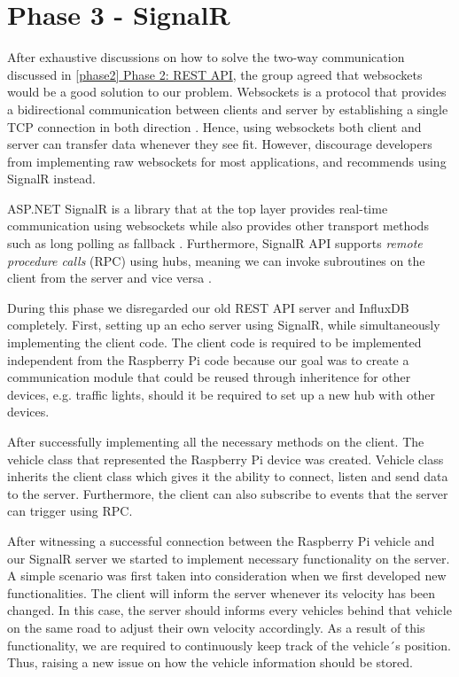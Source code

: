 \section{Phase 3 - SignalR}\label{phase3}
After exhaustive discussions on how to solve the two-way communication discussed in \hyperref[phase2]{\ref{phase2} Phase 2: REST API}, the group agreed that websockets would be a good solution to our problem. Websockets is a protocol that provides a bidirectional communication between clients and server by establishing a single TCP connection in both direction \parencite{rfc_websockets}. Hence, using websockets both client and server can transfer data whenever they see fit. However, \cite{microsoft_websockets} discourage developers from implementing raw websockets for most applications, and recommends using SignalR instead.

ASP.NET SignalR is a library that at the top layer provides real-time communication using websockets while also provides other transport methods such as long polling as fallback \parencite{microsoft_signalr}. Furthermore, SignalR API supports \emph{remote procedure calls} (RPC) using hubs, meaning we can invoke subroutines on the client from the server and vice versa \parencite{microsoft_signalr}.

During this phase we disregarded our old REST API server and InfluxDB completely. First, setting up an echo server using SignalR, while simultaneously implementing the client code. The client code is required to be implemented independent from the Raspberry Pi code because our goal was to create a communication module that could be reused through inheritence for other devices, e.g. traffic lights, should it be required to set up a new hub with other devices.

After successfully implementing all the necessary methods on the client. The vehicle class that represented the Raspberry Pi device was created. Vehicle class inherits the client class which gives it the ability to connect, listen and send data to the server. Furthermore, the client can also subscribe to events that the server can trigger using RPC.

After witnessing a successful connection between the Raspberry Pi vehicle and our SignalR server we started to implement necessary functionality on the server. A simple scenario was first taken into consideration when we first developed new functionalities. The client will inform the server whenever its velocity has been changed. In this case, the server should informs every vehicles behind that vehicle on the same road to adjust their own velocity accordingly. As a result of this functionality, we are required to continuously keep track of the vehicle´s position. Thus, raising a new issue on how the vehicle information should be stored.

